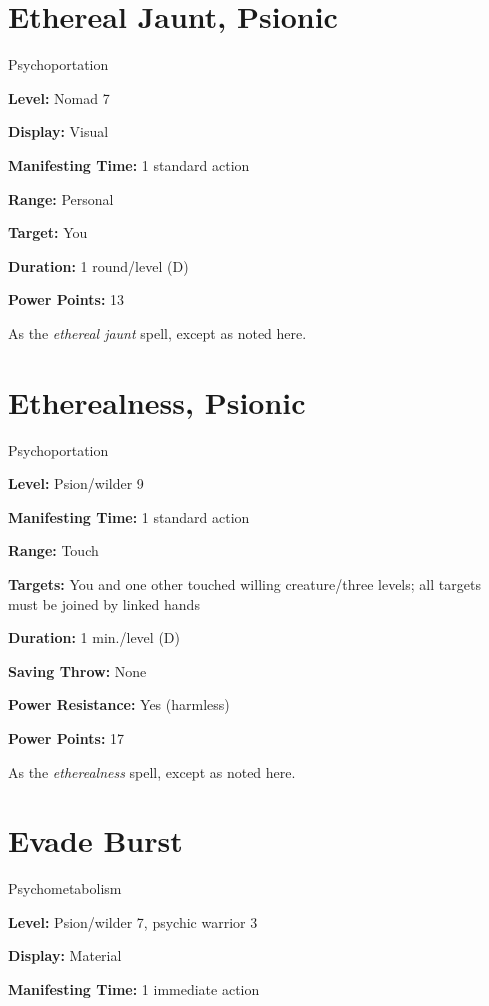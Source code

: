 \documentclass{article}
\begin{document}
\vspace{12pt}
\section*{Ethereal Jaunt, Psionic}

Psychoportation

\textbf{Level:} Nomad 7

\textbf{Display:} Visual

\textbf{Manifesting Time:} 1 standard action

\textbf{Range:} Personal

\textbf{Target:} You

\textbf{Duration:} 1 round/level (D)

\textbf{Power Points:} 13

As the \textit{ethereal jaunt }spell, except as noted here.

\vspace{12pt}
\section*{Etherealness, Psionic}

Psychoportation

\textbf{Level:} Psion/wilder 9

\textbf{Manifesting Time:} 1 standard action

\textbf{Range:} Touch

\textbf{Targets:} You and one other touched willing creature/three levels; all 
targets must be joined by linked hands

\textbf{Duration:} 1 min./level (D)

\textbf{Saving Throw:} None

\textbf{Power Resistance:} Yes (harmless)

\textbf{Power Points:} 17

As the \textit{etherealness }spell, except as noted here.

\vspace{12pt}
\section*{Evade Burst}

Psychometabolism

\textbf{Level:} Psion/wilder 7, psychic warrior 3

\textbf{Display:} Material

\textbf{Manifesting Time:} 1 immediate action
\end{document}
